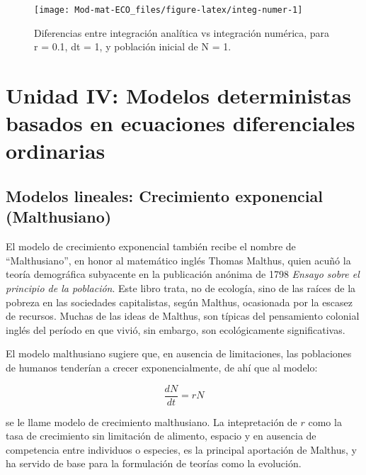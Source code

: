 \documentclass[
]{book}
\begin{document}
\begin{figure}

{\centering \texttt{[image: Mod-mat-ECO\_files/figure-latex/integ-numer-1]} 

}

\caption{Diferencias entre integración analítica vs integración numérica, para r = 0.1, dt = 1, y población inicial de N = 1.}\label{fig:integ-numer}
\end{figure}

\hypertarget{unidad-iv-modelos-deterministas-basados-en-ecuaciones-diferenciales-ordinarias}{%
\chapter{Unidad IV: Modelos deterministas basados en ecuaciones diferenciales ordinarias}\label{unidad-iv-modelos-deterministas-basados-en-ecuaciones-diferenciales-ordinarias}}

\hypertarget{modelos-lineales-crecimiento-exponencial-malthusiano}{%
\section{Modelos lineales: Crecimiento exponencial (Malthusiano)}\label{modelos-lineales-crecimiento-exponencial-malthusiano}}

El modelo de crecimiento exponencial también recibe el nombre de ``Malthusiano'', en honor al matemático inglés Thomas Malthus, quien acuñó la teoría demográfica subyacente en la publicación anónima de 1798 \emph{Ensayo sobre el principio de la población}. Este libro trata, no de ecología, sino de las raíces de la pobreza en las sociedades capitalistas, según Malthus, ocasionada por la escasez de recursos. Muchas de las ideas de Malthus, son típicas del pensamiento colonial inglés del período en que vivió, sin embargo, son ecológicamente significativas.

El modelo malthusiano sugiere que, en ausencia de limitaciones, las poblaciones de humanos tenderían a crecer exponencialmente, de ahí que al modelo:

\begin{equation}
 \frac{dN}{dt} = rN \label{eq:Malthus}
\end{equation}

se le llame modelo de crecimiento malthusiano. La intepretación de \(r\) como la tasa de crecimiento sin limitación de alimento, espacio y en ausencia de competencia entre individuos o especies, es la principal aportación de Malthus, y ha servido de base para la formulación de teorías como la evolución.
\end{document}
